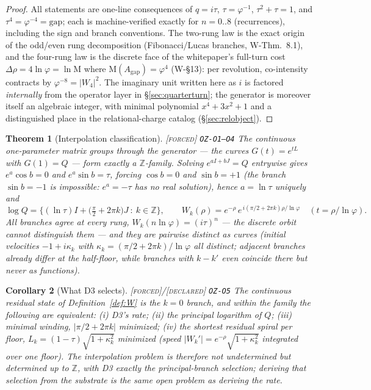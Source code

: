 \documentclass[11pt]{article}
\newcommand{\tagF}{\textcolor{cF}{\textsc{[forced]}}}
\newcommand{\tagD}{\textcolor{cD}{\textsc{[declared]}}}
\newcommand{\hx}[1]{\textcolor{cC}{\footnotesize\texttt{#1}}}
\newcommand{\Z}{\mathbb{Z}}
\newcommand{\gp}{\varphi}
\newcommand{\gapc}{\mathrm{gap}}
\newcommand{\M}{\mathrm{M}}
\theoremstyle{plain}
\newtheorem{theorem}{Theorem}[section]
\newtheorem{corollary}[theorem]{Corollary}
\theoremstyle{definition}
\theoremstyle{remark}
\begin{document}
\begin{proof}
All statements are one-line consequences of $q=i\tau$, $\tau=\gp^{-1}$,
$\tau^2+\tau=1$, and $\tau^4=\gp^{-4}=\gapc$; each is machine-verified exactly
for $n=0..8$ (recurrences), including the sign and branch conventions.
The two-rung law is the exact origin of the odd/even rung decomposition
(Fibonacci/Lucas branches, W-Thm.\ 8.1), and the four-rung law is the discrete
face of the whitepaper's full-turn cost $\Delta\rho=4\ln\gp=\ln\M$ where
$\M(A_{\gapc})=\gp^4$ (W-\S13): per revolution, co-intensity contracts by
$\gp^{-8}=|W_4|^2$. The imaginary unit written here as $i$ is factored
\emph{internally} from the operator layer in \S\ref{sec:quarterturn}; the
generator is moreover itself an algebraic integer, with minimal polynomial
$x^4+3x^2+1$ and a distinguished place in the relational-charge catalog
(\S\ref{sec:relobject}).
\end{proof}



\begin{theorem}[Interpolation classification]\label{thm:interp}\tagF{} \hx{OZ-O1--O4}
The continuous one-parameter matrix groups through the generator --- the curves
$G(t)=e^{tL}$ with $G(1)=Q$ --- form exactly a $\Z$-family. Solving
$e^{aI+bJ}=Q$ entrywise gives $e^a\cos b=0$ and $e^a\sin b=\tau$, forcing
$\cos b=0$ and $\sin b=+1$ (the branch $\sin b=-1$ is impossible: $e^a=-\tau$
has no real solution), hence $a=\ln\tau$ uniquely and
\[
\log Q=\bigl\{(\ln\tau)I+\bigl(\tfrac\pi2+2\pi k\bigr)J\ :\ k\in\Z\bigr\},
\qquad
W_k(\rho)=e^{-\rho}\,e^{\,i(\pi/2+2\pi k)\rho/\ln\gp}
\quad(t=\rho/\ln\gp).
\]
All branches agree at \emph{every} rung, $W_k(n\ln\gp)=(i\tau)^n$ --- the
discrete orbit cannot distinguish them --- and they are pairwise distinct as
curves (initial velocities $-1+i\kappa_k$ with
$\kappa_k=(\pi/2+2\pi k)/\ln\gp$ all distinct; adjacent branches already
differ at the half-floor, while branches with $k-k'$ even coincide there but
never as functions).
\end{theorem}

\begin{corollary}[What D3 selects]\label{cor:d3select}\tagF{}/\tagD{} \hx{OZ-O5}
The continuous residual state of Definition~\ref{def:W} is the $k=0$ branch,
and within the family the following are equivalent: (i) D3's rate; (ii) the
\emph{principal} logarithm of $Q$; (iii) minimal winding,
$|\pi/2+2\pi k|$ minimized; (iv) the shortest residual spiral per floor,
$L_k=(1-\tau)\sqrt{1+\kappa_k^2}$ minimized (speed
$|W_k'|=e^{-\rho}\sqrt{1+\kappa_k^2}$ integrated over one floor). The
interpolation problem is therefore not undetermined but \emph{determined up to
$\Z$}, with D3 exactly the principal-branch selection; deriving that selection
from the substrate is the same open problem as deriving the rate.
\end{corollary}
\end{document}
